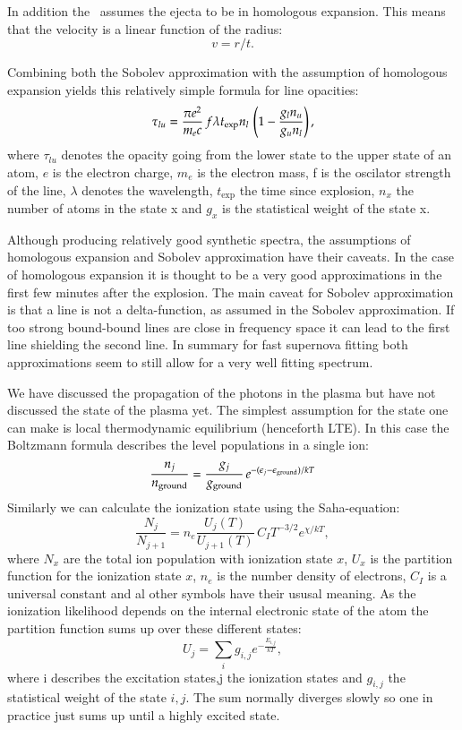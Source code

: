 In addition the \mlc\ assumes the ejecta to be in homologous expansion. This means that the velocity is a linear function of the radius:
\[
	v=  r / t.
\]

Combining both the Sobolev approximation with the assumption of homologous expansion yields this relatively simple formula for line opacities:
\[
\tau_{lu} = \frac{\pi e^2}{m_e c}\, f \lambda t_{\rm exp} n_l\, \left(1 - \frac{g_l n_u}{g_u n_l}\right), 
\]
where $\tau_{lu}$ denotes the opacity going from the lower state to the upper state of an atom, $e$ is the electron charge, $m_e$ is the electron mass, f is the oscilator strength of the line, $\lambda$ denotes the wavelength, $t_\textrm{exp}$ the time since explosion, $n_x$ the number of atoms in the state x and $g_x$ is the statistical weight of the state x.

Although producing relatively good synthetic spectra, the assumptions of homologous expansion and Sobolev approximation have their caveats. In the case of homologous expansion it is thought to be a very good approximations in the first few minutes after the explosion. The main caveat for Sobolev approximation is that a line is not a delta-function, as assumed in the Sobolev approximation. If too strong bound-bound lines are close in frequency space it can lead to the first line shielding the second line. In summary for fast supernova fitting both approximations seem to still allow for a very well fitting spectrum.

We have discussed the propagation of the photons in the plasma but have not discussed the state of the plasma yet. The simplest assumption for the state one can make is local thermodynamic equilibrium (henceforth LTE). In this case the Boltzmann formula describes the level populations in a single ion:
\[
\frac{n_j}{n_{\rm ground}} = \frac{g_j}{g_{\rm ground}}\,e^{-(\epsilon_j - \epsilon_{\rm ground})/kT}
\]
Similarly we can calculate the ionization state using the Saha-equation:
\[
	\frac{N_j}{N_{j+1}} = n_e \frac{U_j(T)}{U_{j+1}(T)}\,C_I T^{-3/2} e^{\chi/kT},
\]
where $N_x$ are the total ion population with ionization state $x$, $U_x$ is the partition function for the ionization state $x$, $n_e$ is the number density of electrons, $C_I$ is a universal constant and al other symbols have their ususal meaning. As the ionization likelihood depends on the internal electronic state of the atom the partition function sums up over these different states:
\[
U_j = \sum_i g_{i,j} e^{-\frac{E_{i,j}}{kT}},
\]
where i describes the excitation states,j the ionization states and $g_{i,j}$ the statistical weight of the state $i,j$. 
The sum normally diverges slowly so one in practice just sums up until a highly excited state.

